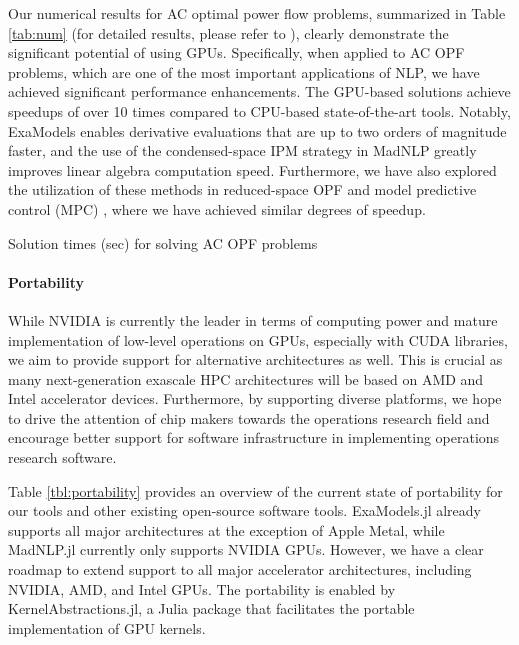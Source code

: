 Our numerical results for AC optimal power flow problems, summarized
in Table \ref{tab:num} (for detailed results, please refer to
\cite{shin2023accelerating}), clearly demonstrate the significant
potential of using GPUs. Specifically, when applied to AC OPF
problems, which are one of the most important applications of NLP, we
have achieved significant performance enhancements. The GPU-based
solutions achieve speedups of over 10 times compared to CPU-based
state-of-the-art tools. Notably, ExaModels enables derivative
evaluations that are up to two orders of magnitude faster, and the use
of the condensed-space IPM strategy in MadNLP greatly improves linear
algebra computation speed. Furthermore, we have also explored the
utilization of these methods in reduced-space OPF
\cite{pacaud2023accelerating} and model predictive control (MPC)
\cite{cole2023exploiting}, where we have achieved similar degrees of
speedup.


\begin{table}[t]
  \begin{center}
    
    \vspace{-1em}
    \footnotesize
  \end{center}
  \vspace{-.075in}
  \caption{Solution times (sec) for solving AC OPF problems}
  \vspace{-.075in}
  \label{tab:num}
\end{table}

\paragraph{Portability}


While NVIDIA is currently the leader in terms of computing power and mature
implementation of low-level operations on GPUs, especially with CUDA
libraries, we aim to provide support for alternative architectures as
well. This is crucial as many next-generation exascale HPC
architectures will be based on AMD and Intel accelerator devices.
Furthermore, by supporting diverse platforms, we hope to drive the attention
of chip makers towards the operations research field and encourage better
support for software infrastructure in implementing operations research software.

Table \ref{tbl:portability} provides an overview of the current state
of portability for our tools and other existing open-source software
tools. ExaModels.jl already supports all major architectures at
the exception of Apple Metal, while
MadNLP.jl currently only supports NVIDIA GPUs. However, we have a
clear roadmap to extend support to all major accelerator
architectures, including NVIDIA, AMD, and Intel GPUs. The portability
is enabled by KernelAbstractions.jl, a Julia package that facilitates
the portable implementation of GPU kernels.

